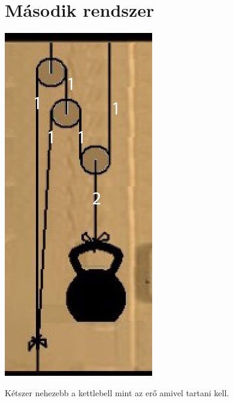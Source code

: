 \documentclass{article}[12pt,a4paper]
\begin{document}
\section{Második rendszer}
\begin{center}
\includegraphics[scale=0.5]{2kettle}
\end{center}
Kétszer nehezebb a kettlebell mint az erő amivel tartani kell.
\end{document}
